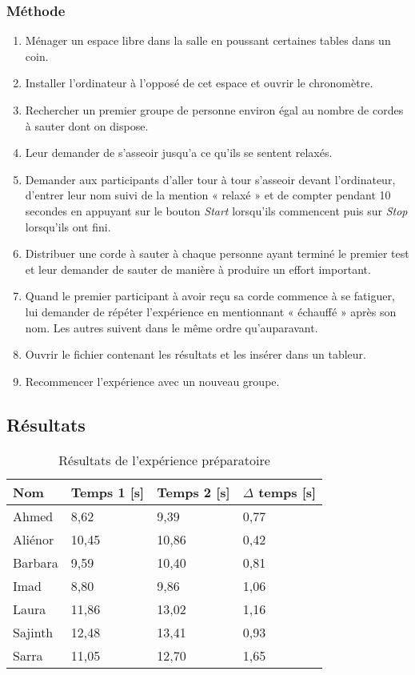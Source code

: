 \documentclass[12pt,fleqn,oneside,openany]{book} %
\begin{document}
\subsubsection{Méthode} \label{sssec:methode2.1}
\begin{enumerate}
	\item Ménager un espace libre dans la salle en poussant certaines tables dans un coin.
	\item Installer l'ordinateur à l'opposé de cet espace et ouvrir le chronomètre.
	\item Rechercher un premier groupe de personne environ égal au nombre de cordes à sauter dont on dispose.
	\item Leur demander de s'asseoir jusqu'a ce qu'ils se sentent relaxés.
	\item Demander aux participants d'aller tour à tour s'asseoir devant l'ordinateur, d'entrer leur nom suivi de la mention « relaxé » et de compter pendant 10 secondes en appuyant sur le bouton \emph{Start} lorsqu'ils commencent puis sur \emph{Stop} lorsqu'ils ont fini.
	\item Distribuer une corde à sauter à chaque personne ayant terminé le premier test et leur demander de sauter de manière à produire un effort important.
	\item Quand le premier participant à avoir reçu sa corde commence à se fatiguer, lui demander de répéter l'expérience en mentionnant « échauffé » après son nom. Les autres suivent dans le même ordre qu'auparavant.
	\item Ouvrir le fichier contenant les résultats et les insérer dans un tableur.
	\item Recommencer l'expérience avec un nouveau groupe.
\end{enumerate}

\subsection{Résultats} \label{ssec:resultats2.1}

\begin{table}[h]
	\centering
	\caption{Résultats de l'expérience préparatoire} \label{tbl:exp2.1}
	\begin{tabular}{llll}
		\toprule 
		\textbf{Nom} & \textbf{Temps 1 [s]} & \textbf{Temps 2 [s]} & \textbf{$\Delta$ temps [s]} \\ \midrule
		Ahmed & 8,62 & 9,39 & 0,77 \\
		Aliénor & 10,45 & 10,86 & 0,42 \\
		Barbara & 9,59 & 10,40 & 0,81 \\
		Imad & 8,80 & 9,86 & 1,06 \\
		Laura & 11,86 & 13,02 & 1,16 \\
		Sajinth & 12,48 & 13,41 & 0,93 \\
		Sarra & 11,05 & 12,70 & 1,65 \\ \bottomrule
	\end{tabular}
\end{table}
\end{document}
